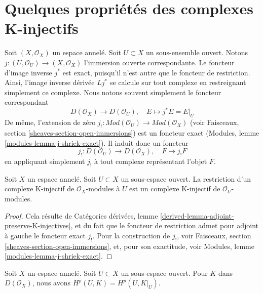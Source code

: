 {\section{Quelques propriétés des complexes K-injectifs}

\label{section-properties-K-injective}

\noindent

Soit $(X, \mathcal{O}_X)$ un espace annelé. Soit $U \subset X$ un sous-ensemble ouvert. Notons $j : (U, \mathcal{O}_U) \to (X, \mathcal{O}_X)$
l'immersion ouverte correspondante. Le foncteur d'image inverse $j^*$ est exact, puisqu'il n'est autre que le foncteur de restriction. Ainsi, l'image inverse dérivée $Lj^*$ se calcule sur tout complexe en restreignant simplement ce complexe. Nous notons souvent simplement le foncteur correspondant
$$
D(\mathcal{O}_X) \to D(\mathcal{O}_U),
\quad
E \mapsto j^*E = E|_U
$$
De même, l'extension de zéro
$j_! : \textit{Mod}(\mathcal{O}_U) \to \textit{Mod}(\mathcal{O}_X)$
(voir Faisceaux, section \ref{sheaves-section-open-immersions}) est un foncteur exact (Modules, lemme \ref{modules-lemma-j-shriek-exact}). Il induit donc un foncteur
$$
j_! : D(\mathcal{O}_U) \to D(\mathcal{O}_X),\quad
F \mapsto j_!F
$$
en appliquant simplement $j_!$ à tout complexe représentant l'objet $F$.

\begin{lemma}

\label{lemma-restrict-K-injective-to-open}

Soit $X$ un espace annelé. Soit $U \subset X$ un sous-espace ouvert. La restriction d'un complexe K-injectif de $\mathcal{O}_X$-modules à $U$ est un complexe K-injectif de $\mathcal{O}_U$-modules.

\end{lemma}

\begin{proof}
Cela résulte de Catégories dérivées, lemme \ref{derived-lemma-adjoint-preserve-K-injectives}, et du fait que le foncteur de restriction admet pour adjoint à gauche le foncteur exact $j_!$. Pour la construction de $j_!$, voir Faisceaux, section \ref{sheaves-section-open-immersions}, et, pour son exactitude, voir Modules, lemme \ref{modules-lemma-j-shriek-exact}.
\end{proof}

\begin{lemma}

\label{lemma-unbounded-cohomology-of-open}
Soit $X$ un espace annelé. Soit $U \subset X$ un sous-espace ouvert. Pour $K$ dans $D(\mathcal{O}_X)$, nous avons $H^p(U, K) = H^p(U, K|_U)$.
\end{lemma}

}
